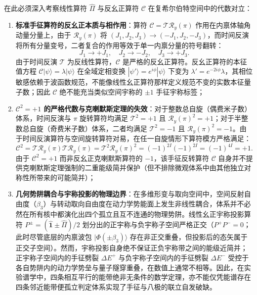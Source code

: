 在此必须深入考察线性算符 $\hat{\Pi}$ 与反幺正算符 $\mathcal{C}$ 在复希尔伯特空间中的代数对立：
\begin{enumerate}
\item \textbf{标准手征算符的反幺正本质与相作用}：算符 $\mathcal{C} = \mathcal{T} \mathcal{R}_y(\pi)$ 作用在内禀体轴角动量分量上，由于 $\mathcal{R}_y(\pi)$ 将 $(J_1, J_2, J_3) \to (-J_1, J_2, -J_3)$，而时间反演将所有分量变号，二者复合的作用等效于单一内禀分量的符号翻转：
\begin{equation}\label{eq:3-7-C-action}
J_1 \to +J_1, \quad J_2 \to -J_2, \quad J_3 \to +J_3.
\end{equation}
由于时间反演 $\mathcal{T}$ 为反线性算符，$\mathcal{C}$ 是严格的反幺正算符。反幺正算符的本征值方程 $\mathcal{C}|\psi\rangle = \lambda |\psi\rangle$ 在全域定相变换 $|\psi'\rangle = e^{i\phi}|\psi\rangle$ 下变为 $\lambda' = e^{-2i\phi}\lambda$，其相位敏感依赖于波函数规范，不能像线性幺正算符那样定义规范不变的实数本征量子数；因此 $\mathcal{C}$ 绝不能充当类似空间宇称的 $\pm 1$ 手征宇称标签；
\item \textbf{$\mathcal{C}^2 = +1$ 的严格代数与克喇默斯定理的失效}：对于整数总自旋（偶费米子数）体系，时间反演与 $\pi$ 旋转算符均满足 $\mathcal{T}^2 = +1$ 且 $\mathcal{R}_y(\pi)^2 = +1$；对于半整数总自旋（奇费米子数）体系，二者均满足 $\mathcal{T}^2 = -1$ 且 $\mathcal{R}_y(\pi)^2 = -1$。由于时间反演算符与空间旋转算符对易，在任一自旋情形下算符模方严格满足：
\begin{equation}\label{eq:3-7-C-square}
\mathcal{C}^2 = \mathcal{T} \mathcal{R}_y(\pi) \mathcal{T} \mathcal{R}_y(\pi) = \mathcal{T}^2 \mathcal{R}_y(\pi)^2 = (-1)^{2I} (-1)^{2I} = (-1)^{4I} = +1.
\end{equation}
由于 $\mathcal{C}^2 = +1$ 而非反幺正克喇默斯算符的 $-1$，该手征反转算符 $\mathcal{C}$ 自身并不提供克喇默斯定理强制的二重能级简并保护（但不排除微观体系中由其他独立对称性所带来的可能简并）；
\item \textbf{几何势阱耦合与宇称投影的物理边界}：在多维形变与取向空间中，空间反射自由度（$\beta_3$）与转动取向自由度在动力学势能面上发生非线性耦合，体系并不必然在所有核中都演化出四个孤立且互不连通的物理势阱。线性幺正宇称投影算符 $P^\pm = (\hat{\mathbf{1}} \pm \hat{\Pi})/2$ 划分出的正宇称与负宇称子空间严格正交（$P^+ P^- = 0$；此时尽管底层的内禀波包 $|\Phi(\pm\beta_3)\rangle$ 存在非正交重叠，但投影后的态矢属于正交子空间）。然而，宇称投影自身绝不保证正负宇称带之间的能级近简并；正宇称子空间内的手征劈裂 $\Delta E^+$ 与负宇称子空间内的手征劈裂 $\Delta E^-$ 受控于各自势阱内的动力学势垒与量子隧穿重叠，在数值上通常不相等。因此，在实验谱学中，四条相互平行的能带绝非无条件的数学定理，亦不能仅凭能谱存在四条邻近能带便孤立判定体系实现了手征与八极的联立自发破缺。
\end{enumerate}

